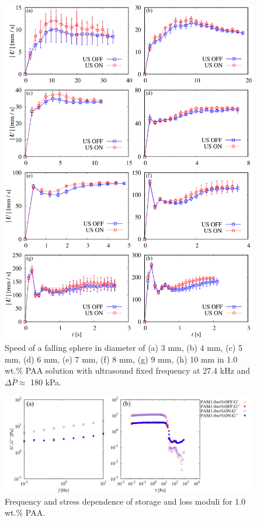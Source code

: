 \begin{figure}[ht]
    \begin{center}
        \includegraphics[width=13cm,clip]{5-Discussion/iwamuro-fall.png}
    \caption{Speed of a falling sphere in diameter of (a) 3 mm, (b) 4 mm, (c) 5 mm, (d) 6 mm, (e) 7 mm, (f) 8 mm, (g) 9 mm, (h) 10 mm in 1.0 wt.\% PAA solution with ultrasound fixed frequency at 27.4 kHz and $\Delta \bar{P} \approx$ 180 kPa\cite{ref:8}.}
    \label{fig:iwamuro-fall}
    \end{center}
\end{figure}

\begin{figure}[ht]
    \includegraphics[width=15cm,clip]{5-Discussion/iwamuro-G.PNG}
    \caption{Frequency and stress dependence of storage and loss moduli for 1.0 wt.\% PAA.\cite{ref:8}}
    \label{fig:iwamuro-G}
\end{figure}

